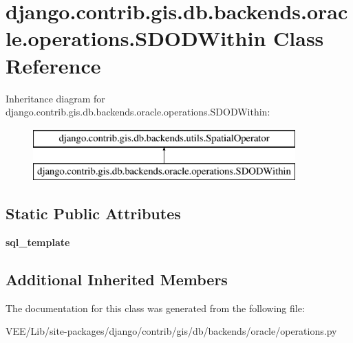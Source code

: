 \hypertarget{classdjango_1_1contrib_1_1gis_1_1db_1_1backends_1_1oracle_1_1operations_1_1_s_d_o_d_within}{}\section{django.\+contrib.\+gis.\+db.\+backends.\+oracle.\+operations.\+S\+D\+O\+D\+Within Class Reference}
\label{classdjango_1_1contrib_1_1gis_1_1db_1_1backends_1_1oracle_1_1operations_1_1_s_d_o_d_within}
Inheritance diagram for django.\+contrib.\+gis.\+db.\+backends.\+oracle.\+operations.\+S\+D\+O\+D\+Within\+:\begin{figure}[H]
\begin{center}
\leavevmode
\includegraphics[height=2.000000cm]{classdjango_1_1contrib_1_1gis_1_1db_1_1backends_1_1oracle_1_1operations_1_1_s_d_o_d_within}
\end{center}
\end{figure}
\subsection*{Static Public Attributes}
\begin{DoxyCompactItemize}
\item 
\mbox{\label{classdjango_1_1contrib_1_1gis_1_1db_1_1backends_1_1oracle_1_1operations_1_1_s_d_o_d_within_a4c632bbec42a29b03ccb930856509e0f}} 
{\bfseries sql\+\_\+template}
\end{DoxyCompactItemize}
\subsection*{Additional Inherited Members}


The documentation for this class was generated from the following file\+:\begin{DoxyCompactItemize}
\item 
V\+E\+E/\+Lib/site-\/packages/django/contrib/gis/db/backends/oracle/operations.\+py\end{DoxyCompactItemize}

